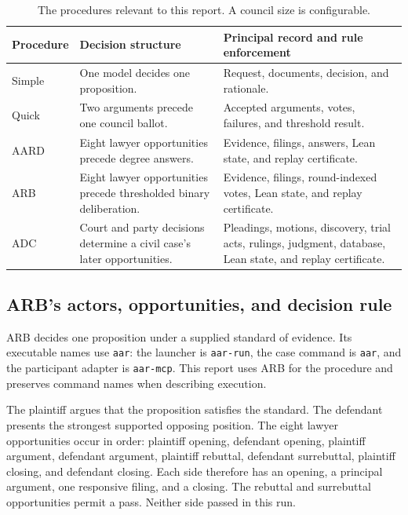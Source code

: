 \documentclass[11pt]{article}
\newcommand{\code}[1]{\texttt{#1}}
\begin{document}
\begin{table}[htbp]
\centering
\small
\caption{The procedures relevant to this report.  A council size is configurable.}
\label{tab:procedures}
\begin{tabularx}{\textwidth}{@{}L{0.12\textwidth}Y Y@{}}
\toprule
Procedure & Decision structure & Principal record and rule enforcement \\
\midrule
Simple & One model decides one proposition. & Request, documents, decision, and rationale. \\
Quick & Two arguments precede one council ballot. & Accepted arguments, votes, failures, and threshold result. \\
AARD & Eight lawyer opportunities precede degree answers. & Evidence, filings, answers, Lean state, and replay certificate. \\
ARB & Eight lawyer opportunities precede thresholded binary deliberation. & Evidence, filings, round-indexed votes, Lean state, and replay certificate. \\
ADC & Court and party decisions determine a civil case's later opportunities. & Pleadings, motions, discovery, trial acts, rulings, judgment, database, Lean state, and replay certificate. \\
\bottomrule
\end{tabularx}
\end{table}

\subsection{ARB's actors, opportunities, and decision rule}

ARB decides one proposition under a supplied standard of evidence.  Its executable names use \code{aar}: the launcher is \code{aar-run}, the case command is \code{aar}, and the participant adapter is \code{aar-mcp}.  This report uses ARB for the procedure and preserves command names when describing execution.

The plaintiff argues that the proposition satisfies the standard.  The defendant presents the strongest supported opposing position.  The eight lawyer opportunities occur in order: plaintiff opening, defendant opening, plaintiff argument, defendant argument, plaintiff rebuttal, defendant surrebuttal, plaintiff closing, and defendant closing.  Each side therefore has an opening, a principal argument, one responsive filing, and a closing.  The rebuttal and surrebuttal opportunities permit a pass.  Neither side passed in this run.
\end{document}
